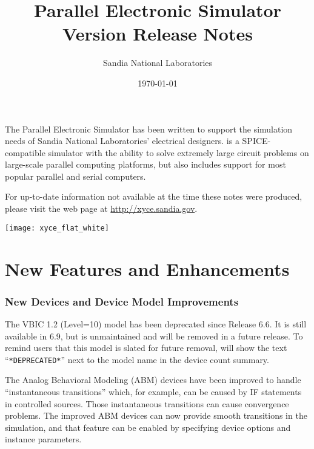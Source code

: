 \documentclass{article}
\title{\XyceTitle{} Parallel Electronic Simulator\\
Version \XyceVersionVar{} Release Notes}
\author{ Sandia National Laboratories}
\date{\today}
\begin{document}
\maketitle

The \XyceTM{} Parallel Electronic Simulator has been written to support the
simulation needs of Sandia National Laboratories' electrical designers.
\XyceTM{} is a SPICE-compatible simulator with the ability to solve extremely
large circuit problems on large-scale parallel computing platforms, but also
includes support for most popular parallel and serial computers.

For up-to-date information not available at the time these notes were produced,
please visit the \XyceTM{} web page at
{\color{XyceDeepRed}\url{http://xyce.sandia.gov}}.


\tableofcontents
\vspace*{\fill}
\parbox{\textwidth}
{
  \hfill
  \texttt{[image: xyce\_flat\_white]}
}


\newpage
\section{New Features and Enhancements}

\subsubsection*{New Devices and Device Model Improvements}
\begin{XyceItemize}
\item The VBIC 1.2 (Level=10) model has been deprecated since \Xyce{} Release
     6.6.  It is still available in \Xyce{} 6.9, but is unmaintained and will
     be removed in a future release.  To remind users that this model is slated
     for future removal, \Xyce{} will show the text ``\texttt{*DEPRECATED*}''
     next to the model name in the device count summary.

\item The Analog Behavioral Modeling (ABM) devices have been improved to handle
     ``instantaneous transitions'' which, for example, can be caused by IF
     statements in controlled sources.  Those instantaneous transitions can
     cause convergence problems.  The improved ABM devices can now provide
     smooth transitions in the simulation, and that feature can be enabled by
     specifying device options and instance parameters.
\end{XyceItemize}
\end{document}
